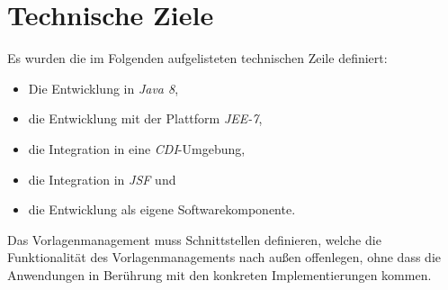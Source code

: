 \section{Technische Ziele}
\label{sec:technical-goals}
Es wurden die im Folgenden aufgelisteten technischen Zeile definiert:
\begin{itemize}
	\item Die Entwicklung in \emph{Java 8},
	\item die Entwicklung mit der Plattform \emph{JEE-7},
	\item die Integration in eine \emph{CDI}-Umgebung,
	\item die Integration in \emph{JSF} und
	\item die Entwicklung als eigene Softwarekomponente.
\end{itemize}
Das Vorlagenmanagement muss Schnittstellen definieren, welche die Funktionalität des Vorlagenmanagements nach außen offenlegen, ohne dass die Anwendungen in Berührung mit den konkreten Implementierungen kommen.